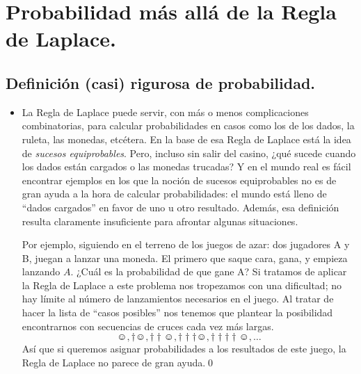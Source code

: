 \section{Probabilidad más allá de la Regla de Laplace.}


\subsection{Definición (casi) rigurosa de probabilidad.}

\begin{itemize}

    \item La Regla de Laplace puede servir, con más o menos complicaciones combinatorias, para calcular probabilidades en casos como los de los dados, la ruleta, las monedas, etcétera. En la base de esa Regla de Laplace está la idea de {\em sucesos equiprobables}. Pero, incluso sin salir del casino, ¿qué sucede cuando los dados están cargados o las monedas trucadas? Y en el mundo real es fácil encontrar ejemplos en los que la noción de sucesos equiprobables no es de gran ayuda a la hora de calcular probabilidades: el mundo está lleno de ``dados cargados'' en favor de uno u otro resultado. Además, esa definición resulta claramente insuficiente para afrontar algunas situaciones.
        \begin{Ejemplo}\label{Sesion08:ejem:LanzamientoMonedaHastPrimeraCara}
        Por ejemplo, siguiendo en el terreno de los juegos de azar: dos jugadores A y B, juegan a lanzar una moneda. El primero que saque cara, gana, y empieza lanzando $A$. ¿Cuál es la probabilidad de que gane A?
        Si tratamos de aplicar la Regla de Laplace a este problema nos tropezamos con una dificultad; no hay límite al número de lanzamientos necesarios en el juego. Al tratar de hacer la lista de ``casos posibles'' nos tenemos que plantear la posibilidad  encontrarnos con secuencias de cruces cada vez más largas.
        \[
        \smiley, \dag\smiley, \dag \dag\smiley, \dag \dag \dag\smiley, \dag \dag \dag \dag\smiley,\ldots
        \]
        Así que si queremos asignar probabilidades a los resultados de este juego, la Regla de Laplace no parece de gran ayuda.\qed
        \end{Ejemplo}



\end{itemize}
